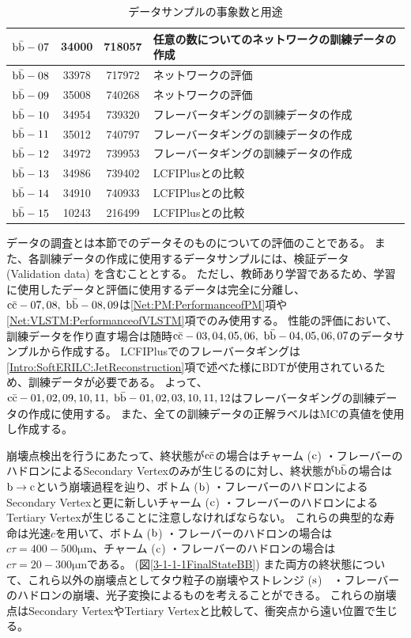 \begin{table}[htb]
\begin{tabular}{c c c l}
    $\rm b\bar{b}-07$ & 34000 & 718057 & 任意の数についてのネットワークの訓練データの作成\\ \hline
    $\rm b\bar{b}-08$ & 33978 & 717972 & ネットワークの評価\\ 
    $\rm b\bar{b}-09$ & 35008 & 740268 & ネットワークの評価\\ \hline
    $\rm b\bar{b}-10$ & 34954 & 739320 & フレーバータギングの訓練データの作成\\ 
    $\rm b\bar{b}-11$ & 35012 & 740797 & フレーバータギングの訓練データの作成\\ 
    $\rm b\bar{b}-12$ & 34972 & 739953 & フレーバータギングの訓練データの作成\\ \hline
    $\rm b\bar{b}-13$ & 34986 & 739402 & LCFIPlusとの比較\\ 
    $\rm b\bar{b}-14$ & 34910 & 740933 & LCFIPlusとの比較\\ 
    $\rm b\bar{b}-15$ & 10243 & 216499 & LCFIPlusとの比較\\ \hline
  \end{tabular}
  \caption{データサンプルの事象数と用途}
  \label{DataSamples}
\end{table}

データの調査とは本節でのデータそのものについての評価のことである。
また、各訓練データの作成に使用するデータサンプルには、検証データ (Validation data) を含むこととする。
ただし、教師あり学習であるため、学習に使用したデータと評価に使用するデータは完全に分離し、$\rm c\bar{c}-07,08,\ \rm b\bar{b}-08,09$は\ref{Net:PM:PerformanceofPM}項や\ref{Net:VLSTM:PerformanceofVLSTM}項でのみ使用する。
性能の評価において、訓練データを作り直す場合は随時$\rm c\bar{c}-03,04,05,06,\ \rm b\bar{b}-04,05,06,07$のデータサンプルから作成する。
LCFIPlusでのフレーバータギングは\ref{Intro:SoftERILC:JetReconstruction}項で述べた様にBDTが使用されているため、訓練データが必要である。
よって、$\rm c\bar{c}-01,02,09,10,11,\ \rm b\bar{b}-01,02,03,10,11,12$はフレーバータギングの訓練データの作成に使用する。
また、全ての訓練データの正解ラベルはMCの真値を使用し作成する。

崩壊点検出を行うにあたって、終状態が$\rm c\bar{c}$の場合はチャーム ($\rm c$) ・フレーバーのハドロンによるSecondary Vertexのみが生じるのに対し、終状態が$\rm b\bar{b}$の場合は$\rm b \to c$という崩壊過程を辿り、ボトム ($\rm b$) ・フレーバーのハドロンによるSecondary Vertexと更に新しいチャーム ($\rm c$) ・フレーバーのハドロンによるTertiary Vertexが生じることに注意しなければならない。
これらの典型的な寿命は光速$c$を用いて、ボトム ($\rm b$) ・フレーバーのハドロンの場合は$c \tau = 400-500 \mathrm{\mu m}$、チャーム ($\rm c$) ・フレーバーのハドロンの場合は$c \tau = 20-300 \mathrm{\mu m}$である。 (図\ref{3-1-1-1FinalStateBB})
また両方の終状態について、これら以外の崩壊点としてタウ粒子の崩壊やストレンジ ($\rm s$)　・フレーバーのハドロンの崩壊、光子変換によるものを考えることができる。
これらの崩壊点はSecondary VertexやTertiary Vertexと比較して、衝突点から遠い位置で生じる。

